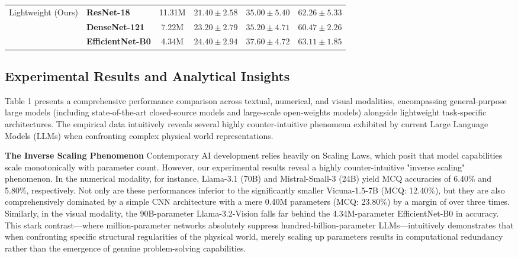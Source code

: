 \begin{table}[t]
\begin{tabular}{@{} l l c c c c @{}}
        \multirow{2}{*}{Lightweight (Ours)} 
        & \textbf{ResNet-18} & 11.31M & \textbf{$21.40 \pm 2.58$} & \textbf{$35.00 \pm 5.40$} & \textbf{$62.26 \pm 5.33$} \\
        & \textbf{DenseNet-121} & 7.22M & \textbf{$23.20 \pm 2.79$} & \textbf{$35.20 \pm 4.71$} & \textbf{$60.47 \pm 2.26$} \\
        & \textbf{EfficientNet-B0} & 4.34M & \textbf{$24.40 \pm 2.94$} & \textbf{$37.60 \pm 4.72$} & \textbf{$63.11 \pm 1.85$} \\
        
        \bottomrule
    \end{tabular}
\end{table}


\subsection{Experimental Results and Analytical Insights}
\label{phenomenon}

Table 1 presents a comprehensive performance comparison across textual, numerical, and visual modalities, encompassing general-purpose large models (including state-of-the-art closed-source models and large-scale open-weights models) alongside lightweight task-specific architectures. The empirical data intuitively reveals several highly counter-intuitive phenomena exhibited by current Large Language Models (LLMs) when confronting complex physical world representations.

\textbf{The Inverse Scaling Phenomenon}
Contemporary AI development relies heavily on Scaling Laws, which posit that model capabilities scale monotonically with parameter count. However, our experimental results reveal a highly counter-intuitive "inverse scaling" phenomenon. In the numerical modality, for instance, Llama-3.1 (70B) and Mistral-Small-3 (24B) yield MCQ accuracies of 6.40\% and 5.80\%, respectively. Not only are these performances inferior to the significantly smaller Vicuna-1.5-7B (MCQ: 12.40\%), but they are also comprehensively dominated by a simple CNN architecture with a mere 0.40M parameters (MCQ: 23.80\%) by a margin of over three times. Similarly, in the visual modality, the 90B-parameter Llama-3.2-Vision falls far behind the 4.34M-parameter EfficientNet-B0 in accuracy. This stark contrast—where million-parameter networks absolutely suppress hundred-billion-parameter LLMs—intuitively demonstrates that when confronting specific structural regularities of the physical world, merely scaling up parameters results in computational redundancy rather than the emergence of genuine problem-solving capabilities.

